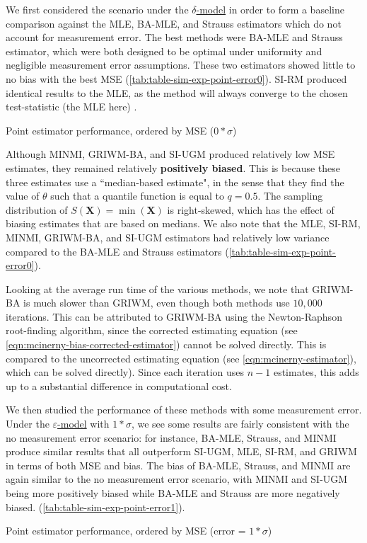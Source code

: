 We first considered the scenario under the \hyperref[model: no-measurement-error]{$\delta$-model} in order to form a baseline comparison against the MLE, BA-MLE, and Strauss estimators which do not account for measurement error. The best methods were BA-MLE and Strauss estimator, which were both designed to be optimal under uniformity and negligible measurement error assumptions. These two estimators showed little to no bias with the best MSE (\autoref{tab:table-sim-exp-point-error0}). SI-RM produced identical results to the MLE, as the method will always converge to the chosen test-statistic (the MLE here) \cite{Garthwaite1992}.
\begin{table}[ht]
    \centering
    \caption{Point estimator performance, ordered by MSE ($0*\sigma$)}
    
    \label{tab:table-sim-exp-point-error0}
\end{table}

Although MINMI, GRIWM-BA, and SI-UGM produced relatively low MSE estimates, they remained relatively \textbf{positively biased}. This is because these three estimates use a ``median-based estimate", in the sense that they find the value of $\theta$ such that a quantile function is equal to $q = 0.5$. The sampling distribution of $S(\bm{X}) = \min(\bm{X})$ is right-skewed, which has the effect of biasing estimates that are based on medians. We also note that the MLE, SI-RM, MINMI, GRIWM-BA, and SI-UGM estimators had relatively low variance compared to the BA-MLE and Strauss estimators (\autoref{tab:table-sim-exp-point-error0}).

Looking at the average run time of the various methods, we note that GRIWM-BA is much slower than GRIWM, even though both methods use $10,000$ iterations. This can be attributed to GRIWM-BA using the Newton-Raphson root-finding algorithm, since the corrected \citet{Mcinerny2006} estimating equation (see \autoref{eqn:mcinerny-bias-corrected-estimator}) cannot be solved directly. This is compared to the uncorrected estimating equation (see \autoref{eqn:mcinerny-estimator}), which can be solved directly). Since each iteration uses $n-1$ \citet{Mcinerny2006} estimates, this adds up to a substantial difference in computational cost.

We then studied the performance of these methods with some measurement error. Under the  \hyperref[model: measurement-error]{$\varepsilon$-model} with $1*\sigma$, we see some results are fairly consistent with the no measurement error scenario: for instance, BA-MLE, Strauss, and MINMI produce similar results that all outperform SI-UGM, MLE, SI-RM, and GRIWM in terms of both MSE and bias. The bias of BA-MLE, Strauss, and MINMI are again similar to the no measurement error scenario, with MINMI and SI-UGM being more positively biased while BA-MLE and Strauss are more negatively biased. (\autoref{tab:table-sim-exp-point-error1}).
\begin{table}[ht]
    \centering
    \caption{Point estimator performance, ordered by MSE (error = $1*\sigma$)}
    
    \label{tab:table-sim-exp-point-error1}
\end{table}

